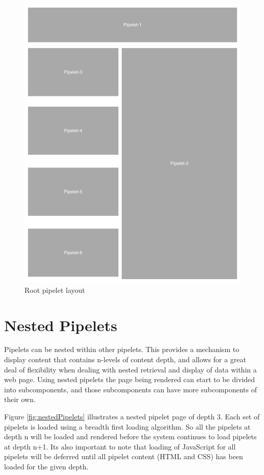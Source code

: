 \documentclass[12pt]{report}
\begin{document}
\begin{figure}[H]
\caption{Root pipelet layout}
\label{fig:rootPipeletLayout}
\centering
\includegraphics[width=\textwidth,keepaspectratio]{figures/images/root_pipelet.pdf}
\end{figure}

	
\section{Nested Pipelets}
Pipelets can be nested within other pipelets. This provides a mechanism to display content that contains n-levels of content depth, and allows for a great deal of flexibility when dealing with nested retrieval and display of data within a web page. Using nested pipelets the page being rendered can start to be divided into subcomponents, and those subcomponents can have more subcomponents of their own. 

Figure \ref{fig:nestedPipelets} illustrates a nested pipelet page of depth 3. Each set of pipelets is loaded using a breadth first loading algorithm. So all the pipelets at depth n will be loaded and rendered before the system continues to load pipelets at depth n+1. Its also important to note that loading of JavaScript for all pipelets will be deferred until all pipelet content (HTML and CSS) has been loaded for the given depth.
\end{document}
